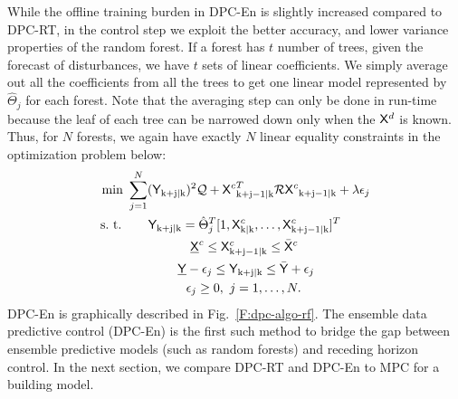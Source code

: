 While the offline training burden in DPC-En is slightly increased compared to DPC-RT, in the control step we exploit the better accuracy, and lower variance properties of the random forest. 
If a forest has $t$ number of trees, given the forecast of disturbances, we have $t$ sets of linear coefficients. We simply average out all the coefficients from all the trees to get one linear model represented by $\hat{\Theta}_j$ for each forest. Note that the averaging step can only be done in run-time because the leaf of each tree can be narrowed down only when the $\mathsf{X}^d$ is known. Thus, for $N$ forests, we again have exactly $N$ linear equality constraints in the optimization problem below:
\begin{align}
\begin{aligned}
\text{min } & \sum_{j=1}^{N} ({\mathsf{Y}}_{\mathrm{k+j|k}})^2 \mathcal{Q} + {\mathsf{X}^c}^T_{\mathrm{k+j-1|k}} \mathcal{R} {\mathsf{X}^c}_{\mathrm{k+j-1|k}} +  \lambda\epsilon_j\\
\text{s.~t. } & \ \ \ \ \ \mathsf{Y}_{\mathrm{k+j|k}} =  \hat{\Theta}^T_j [1,\mathsf{X}^c_{\mathrm{k|k}},\dots,\mathsf{X}^c_{\mathrm{k+j-1|k}} ]^T \\
& \ \ \ \ \ \ \ \ \ \ \ \ \ \ \ \underline{\mathsf{X}}^c \leq \mathsf{X}^c_{\mathrm{k+j-1|k}} \leq \bar{\mathsf{X}}^c\\ 
& \ \ \ \ \ \ \ \ \ \ \ \ \underline{\mathsf{Y}}-\epsilon_j \leq \mathsf{Y}_{\mathrm{k+j|k}} \leq \bar{\mathsf{Y}} + \epsilon_j\\\
& \ \ \ \ \ \ \ \ \ \ \ \ \ \ \epsilon_j \geq 0, \ j = 1,\dots,N.
\end{aligned}
\label{E:dpcrf}
\end{align}
DPC-En is graphically described in Fig.~\ref{F:dpc-algo-rf}. The ensemble data predictive control (DPC-En) is the first such method to bridge the gap between ensemble predictive models (such as random forests) and receding horizon control. In the next section, we compare DPC-RT and DPC-En to MPC for a building model.